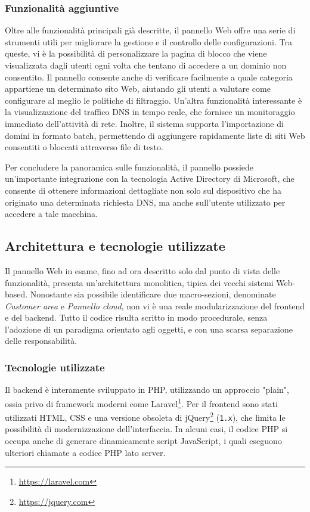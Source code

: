 \subsubsection{Funzionalità aggiuntive}
Oltre alle funzionalità principali già descritte, il pannello Web offre una serie di strumenti utili per migliorare la gestione e il controllo delle configurazioni. Tra queste, vi è la possibilità di personalizzare la pagina di blocco che viene visualizzata dagli utenti ogni volta che tentano di accedere a un dominio non consentito.
%
Il pannello consente anche di verificare facilmente a quale categoria appartiene un determinato sito Web, aiutando gli utenti a valutare come configurare al meglio le politiche di filtraggio.
%
Un’altra funzionalità interessante è la visualizzazione del traffico DNS in tempo reale, che fornisce un monitoraggio immediato dell’attività di rete. Inoltre, il sistema supporta l'importazione di domini in formato batch, permettendo di aggiungere rapidamente liste di siti Web consentiti o bloccati attraverso file di testo.

Per concludere la panoramica sulle funzionalità, il pannello possiede un'importante integrazione con la tecnologia Active Directory di Microsoft, che consente di ottenere informazioni dettagliate non solo sul dispositivo che ha originato una determinata richiesta DNS, ma anche sull’utente utilizzato per accedere a tale macchina.

\subsection{Architettura e tecnologie utilizzate}
Il pannello Web in esame, fino ad ora descritto solo dal punto di vista delle funzionalità, presenta un'architettura monolitica, tipica dei vecchi sistemi Web-based. Nonostante sia possibile identificare due macro-sezioni, denominate \textit{Customer area} e \textit{Pannello cloud}, non vi è una reale modularizzazione del frontend e del backend. Tutto il codice risulta scritto in modo procedurale, senza l’adozione di un paradigma orientato agli oggetti, e con una scarsa separazione delle responsabilità.

\subsubsection{Tecnologie utilizzate}
Il backend è interamente sviluppato in PHP, utilizzando un approccio "plain", ossia privo di framework moderni come Laravel\footnote{\url{https://laravel.com}}. Per il frontend sono stati utilizzati HTML, CSS e una versione obsoleta di jQuery\footnote{\url{https://jquery.com}} (\texttt{1.x}), che limita le possibilità di modernizzazione dell'interfaccia. In alcuni casi, il codice PHP si occupa anche di generare dinamicamente script JavaScript, i quali eseguono ulteriori chiamate a codice PHP lato server.

